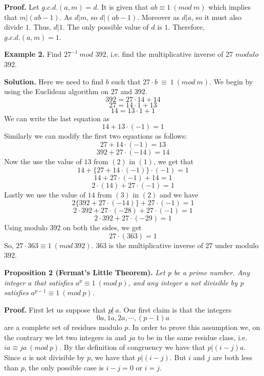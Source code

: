 \documentclass[12pt]{article}
\begin{document}
\textbf{Proof.} Let $g.c.d.(a,m)=d$. It is given that $ ab \equiv 1 \: ( mod \: m)$ which implies that $m|(ab-1)$. As $d|m$, so $d|(ab-1)$. Moreover as $d|a$, so it must also divide $1$. Thus, $d|1$. The only possible value of $d$ is $1$. Therefore, $g.c.d.(a,m)=1$. \par

\textbf{Example 2.}  Find $27^{-1} \: mod $ $392$, i.e. find the multiplicative inverse of $27$ $ modulo$ $392$.

\textbf{Solution.} Here we need to find $b$ such that $27 \cdot b \: \equiv \: 1 \: (mod \: m)$. We begin by using the Euclidean algorithm on $27$ and $392$.
$$ 392 = 27 \cdot 14 + 14 $$
$$ 27 = 14 \cdot 1 + 13 $$
$$ 14 = 13 \cdot 1 + 1 $$
We can write the last equation as
\begin{equation}
14 + 13 \cdot (-1)=1
\end{equation}
Similarly we can modify the first two equations as follows:
\begin{equation}
27 + 14 \cdot (-1)=13
\end{equation}
\begin{equation}
392 + 27 \cdot (-14)=14
\end{equation}
Now the use the value of $13$ from $(2)$ in $(1)$, we get that
$$14 + \{27 + 14 \cdot (-1)\}\cdot (-1)=1$$
$$14 + 27 \cdot (-1)+14=1$$
\begin{equation}
2 \cdot (14)+27 \cdot(-1)=1
\end{equation}
Lastly we use the value of $14$ from $(3)$ in $(2)$ and we have
$$2 \{ 392 + 27 \cdot (-14) \} +27 \cdot(-1)=1$$
$$2 \cdot 392 +27 \cdot (-28)+ 27 \cdot (-1)=1$$
$$2 \cdot 392 + 27 \cdot (-29)=1$$
Using modulo 392 on both the sides, we get
$$27 \cdot(363)=1$$
So, $27 \cdot 363 \equiv 1 \: (mod \: 392)$. $363$ is the multiplicative inverse of $27$ under modulo $392$.

\textbf{Proposition 2 (Fermat's Little Theorem).}
\textit{Let p be a prime number. Any integer a that satisfies $a^p \equiv 1 \: (mod \:p)$, and any integer a not divisible by p satisfies $a^{p-1} \equiv 1 \: ( mod \: p) $.}

\textbf{Proof.} First let us suppose that $p \not| \:a$. Our first claim is that the integers $$0a, 1a, 2a, \cdots, (p-1)a$$ are a complete set of residues modulo $p$. In order to prove this assumption we, on the contrary we let two integers $ia$ and $ja$ to be in the same residue class, i.e. $ia \equiv ja \: (mod \: p)$. By the definition of congruency we have that $p | (i-j)a$. Since $a$ is not divisible by $p$, we have that $p | (i-j)$. But $i$ and $j$ are both less than $p$, the only possible case is $i-j=0$ or $i=j$.
\end{document}
